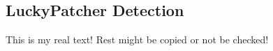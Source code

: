 \subsection{LuckyPatcher Detection} \label{subsection:counter-tampering-luckypatcher}
This is my real text! Rest might be copied or not be checked!
